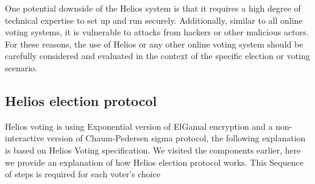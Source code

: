 One potential downside of the Helios system is that it requires a high degree of technical expertise to set up and run securely. Additionally, similar to all online voting systems, it is vulnerable to attacks from hackers or other malicious actors. For these reasons, the use of Helios or any other online voting system should be carefully considered and evaluated in the context of the specific election or voting scenario.


\subsection{Helios election protocol} 
Helios voting is using Exponential version of ElGamal  encryption and a non-interactive version of Chaum-Pedersen sigma protocol, the following explanation is based on Helios Voting specification\cite{Adida2008HeliosWO, Helios}. We visited the components earlier, here we provide an explanation of how Helios election protocol works. This Sequence of steps is required for each voter's choice \\

